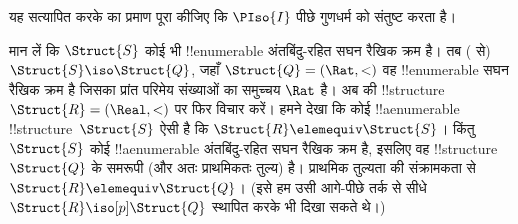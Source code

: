 \documentclass[../../../include/open-logic-section]{subfiles}
\begin{document}
\begin{prob}
  यह सत्यापित करके  का प्रमाण पूरा कीजिए
  कि $\PIso{I}$ पीछे गुणधर्म को संतुष्ट करता है।
\end{prob}

\begin{rem}
  मान लें कि $\Struct{S}$ कोई भी !!{enumerable} अंतबिंदु-रहित सघन रैखिक
  क्रम है। तब ( से) $\Struct{S} \iso
  \Struct{Q}$, जहाँ
  $\Struct{Q} = (\Rat, <)$ वह !!{enumerable} सघन रैखिक क्रम है जिसका प्रांत
  परिमेय संख्याओं का समुच्चय $\Rat$ है। अब  की
  !!{structure}~$\Struct{R} =
  (\Real, <)$ पर फिर विचार करें। हमने देखा कि
  कोई !!a{enumerable} !!{structure}~$\Struct{S}$ ऐसी है कि $\Struct{R}
  \elemequiv \Struct{S}$। किंतु $\Struct{S}$ कोई !!a{enumerable}
  अंतबिंदु-रहित सघन रैखिक क्रम है, इसलिए वह !!{structure}~$\Struct{Q}$ के
  समरूपी (और अतः प्राथमिकतः तुल्य) है। प्राथमिक तुल्यता की संक्रामकता से
  $\Struct{R} \elemequiv
  \Struct{Q}$। (इसे हम उसी आगे-पीछे तर्क से सीधे
  $\Struct{R} \iso[p] \Struct{Q}$ स्थापित करके भी दिखा सकते थे।)
\end{rem}
\end{document}
